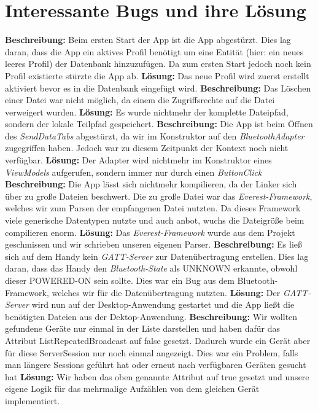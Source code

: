 \documentclass[a4paper]{scrreprt}
\begin{document}
\chapter{Interessante Bugs und ihre Lösung}
\textbf{Beschreibung:} Beim ersten Start der App ist die App abgestürzt. Dies lag daran, dass die App ein aktives Profil benötigt um eine Entität (hier: ein neues leeres Profil) der Datenbank hinzuzufügen. Da zum ersten Start jedoch noch kein Profil existierte stürzte die App ab.
\textbf{Lösung:} Das neue Profil wird zuerst erstellt aktiviert bevor es in die Datenbank eingefügt wird. \newline \newline
\textbf{Beschreibung:} Das Löschen einer Datei war nicht möglich, da einem die Zugriffsrechte auf die Datei verweigert wurden. \newline
\textbf{Lösung:} Es wurde nichtmehr der komplette Dateipfad, sondern der lokale Teilpfad gespeichert. \newline \newline
\textbf{Beschreibung:} Die App ist beim Öffnen des \textit{SendDataTabs} abgestürzt, da wir im Konstruktor auf den \textit{BluetoothAdapter} zugegriffen haben. Jedoch war zu diesem Zeitpunkt der Kontext noch nicht verfügbar. \newline
\textbf{Lösung:} Der Adapter wird nichtmehr im Konstruktor eines \textit{ViewModels} aufgerufen, sondern immer nur durch einen \textit{ButtonClick} \newline \newline
\textbf{Beschreibung: }Die App lässt sich nichtmehr kompilieren, da der Linker sich über zu große Dateien beschwert. Die zu große Datei war das \textit{Everest-Framework}, welches wir zum Parsen der empfangenen Datei nutzten. Da dieses Framework viele generische Datentypen nutzte und auch anbot, wuchs die Dateigröße beim compilieren enorm.\newline
\textbf{Lösung: }Das \textit{Everest-Framework} wurde aus dem Projekt geschmissen und wir schrieben unseren eigenen Parser. \newline \newline
\textbf{Beschreibung:} Es ließ sich auf dem Handy kein \textit{GATT-Server} zur Datenübertragung erstellen. Dies lag daran, dass das Handy den \textit{Bluetooth-State} als \dq{}UNKNOWN\dq{} erkannte, obwohl dieser \dq{}POWERED-ON\dq{} sein sollte. Dies war ein Bug aus dem Bluetooth-Framework, welches wir für die Datenübertragung nutzten. \newline
\textbf{Lösung:} Der \textit{GATT-Server} wird nun auf der Desktop-Anwendung gestartet und die App ließt die benötigten Dateien aus der Dektop-Anwendung. \newline \newline
\textbf{Beschreibung: }Wir wollten gefundene Geräte nur einmal in der Liste darstellen und haben dafür das Attribut ListRepeatedBroadcast auf false gesetzt. Dadurch wurde ein Gerät aber für diese ServerSession nur noch einmal angezeigt. Dies war ein Problem, falls man längere Sessions geführt hat oder erneut nach verfügbaren Geräten gesucht hat \newline
\textbf{Lösung:} Wir haben das oben genannte Attribut auf true gesetzt und unsere eigene Logik für das mehrmalige Aufzählen von dem gleichen Gerät implementiert.
\end{document}
